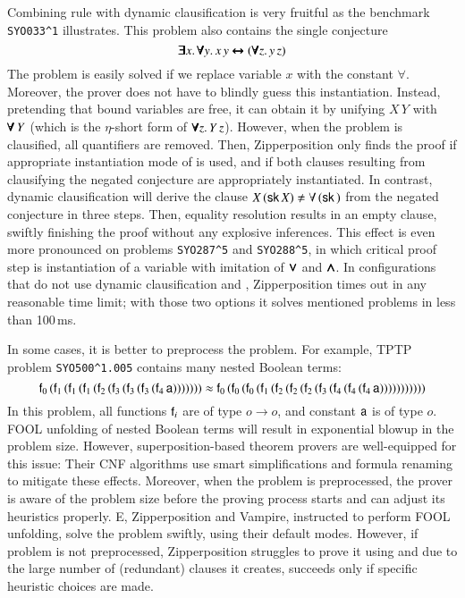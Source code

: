 Combining rule  with dynamic clausification is very fruitful as
the benchmark \texttt{SYO033\^{}1} illustrates. This problem also contains the
single conjecture
$$ \pmb{\exists} x. \, \pmb{\forall} y.  \, x \, y \pmb{\leftrightarrow} (\pmb{\forall} z. \, y \,z)$$ The
problem is easily solved if we replace variable $x$ with the constant $\forall$.
Moreover, the prover does not have to blindly guess this instantiation. Instead,
pretending that bound variables are free, it can obtain it by unifying $  X \, Y
$ with $ \pmb{\forall} \, Y$ (which is the $\eta$-short form of $\pmb{\forall} z. \, Y
\,z$). However, when the problem is clausified, all quantifiers are removed.
Then, Zipperposition only finds the proof if appropriate instantiation mode of
 is used, and if both clauses resulting from clausifying the negated
conjecture are appropriately instantiated. In contrast, dynamic clausification will
derive the clause $ X \, (\cst{sk} \, X) \not\eq \forall \, (\cst{sk} \, ) $
from the negated conjecture in three steps. Then, equality resolution results in
an empty clause, swiftly finishing the proof without any explosive inferences.
This effect is even more pronounced on problems \verb|SYO287^5| and
\verb|SYO288^5|, in which critical proof step is instantiation of a variable
with imitation of $\pmb{\lor}$ and $\pmb{\land}$. In configurations that do not use dynamic
clausification and , Zipperposition times out in any reasonable
time limit; with those two options it solves mentioned problems in less than
100\,ms.

In some cases, it is better to preprocess the problem. For example, TPTP problem
\verb|SYO500^1.005| contains many nested Boolean terms:
$$ \mathsf{f}_0 \, ( \mathsf{f}_1 \, ( \mathsf{f}_1 \, ( \mathsf{f}_1 \, ( \mathsf{f}_2 \, ( \mathsf{f}_3 \, ( \mathsf{f}_3 \, ( \mathsf{f}_3 \, ( \mathsf{f}_4 \, \mathsf{a} ) ) ) ) ) ) ) 
    \approx \mathsf{f}_0 \, ( \mathsf{f}_0 \, ( \mathsf{f}_0 \, ( \mathsf{f}_1 \, ( \mathsf{f}_2 \, ( \mathsf{f}_2 \, ( \mathsf{f}_2 \, ( \mathsf{f}_3 \, ( \mathsf{f}_4 \, ( \mathsf{f}_4 \, ( \mathsf{f}_4 \, \mathsf{a} ) ) ) ) ) ) ) ) ) ) )$$
In this problem, all functions $\mathsf{f}_i$ are of type $o \rightarrow o$, and constant $\mathsf{a}$ is of type $o$.
FOOL unfolding of nested Boolean terms will result in exponential blowup in the problem size. However,
superposition-based theorem provers are well-equipped for this issue: Their CNF algorithms use smart simplifications and
formula renaming to mitigate these effects. Moreover, when the problem is preprocessed, the prover is aware of the problem
size before the proving process starts and can adjust its heuristics properly. E, Zipperposition and Vampire, instructed to perform FOOL unfolding,
solve the problem swiftly, using their default modes. However, if problem is not preprocessed, Zipperposition struggles to prove it using
 and due to the large number of (redundant) clauses it creates, succeeds only if specific heuristic choices are made.

